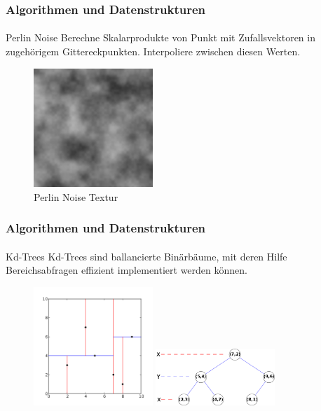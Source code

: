 \documentclass{beamer}
\begin{document}
\begin{frame}
    \frametitle{Algorithmen und Datenstrukturen}
\framesubtitle{}
\begin{block}{Perlin Noise}
Berechne Skalarprodukte von Punkt mit Zufallsvektoren in zugehörigem 
Gittereckpunkten. Interpoliere zwischen diesen Werten. 
\end{block}
\begin{figure}[H]
    \centering
    \includegraphics[width=0.4\textwidth]{images/perlin_noise.png}
    \caption{Perlin Noise Textur}
\end{figure}
\end{frame}


\begin{frame}
    \frametitle{Algorithmen und Datenstrukturen}
\framesubtitle{}
\begin{block}{Kd-Trees}
Kd-Trees sind ballancierte Binärbäume, mit deren Hilfe Bereichsabfragen effizient
implementiert werden können.
\end{block}
\begin{figure}[H]
    \includegraphics[width=0.4\textwidth]{images/kdtree_2d.png}
    \includegraphics[width=0.4\textwidth]{images/kdtree.png}
\end{figure}
\end{frame}
\end{document}
